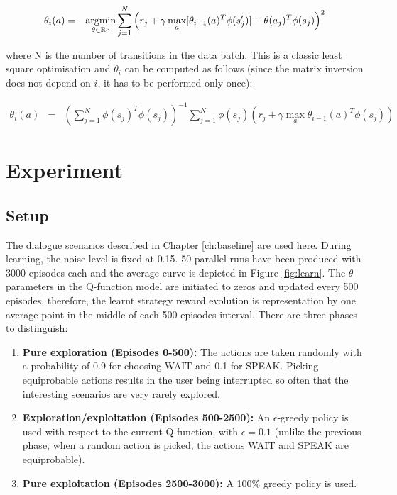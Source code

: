 				\begin{eqnarray}
					\theta_i (a) & = & \mathop{\hbox{argmin}}_{\theta \in \mathbb{R}^p} \sum_{j=1}^N \left(r_j + \gamma \mathop{\hbox{max}}_a [\theta_{i-1}(a)^T \phi(s_j')] - \theta (a_j)^T \phi(s_j) \right)^2
				\end{eqnarray}
            
      	where N is the number of transitions in the data batch. This is a classic least square optimisation and $\theta_i$ can be computed as follows (since the matrix inversion does not depend on $i$, it has to be performed only once):
        
				\begin{eqnarray}
					\theta_i (a) & = & \left( \sum_{j=1}^N \phi(s_j)^T \phi(s_j) \right)^{-1} \sum_{j=1}^N \phi(s_j) \left( r_j + \gamma \max_a \theta_{i-1}(a)^T \phi(s_j) \right)
				\end{eqnarray}

\section{Experiment}
	
    \subsection{Setup}

		The dialogue scenarios described in Chapter \ref{ch:baseline} are used here. During learning, the noise level is fixed at 0.15. 50 parallel runs have been produced with 3000 episodes each and the average curve is depicted in Figure \ref{fig:learn}. The $\theta$ parameters in the Q-function model are initiated to zeros and updated every 500 episodes, therefore, the learnt strategy reward evolution is representation by one average point in the middle of each 500 episodes interval. There are three phases to distinguish:
        
        \begin{enumerate}
        	\item \textbf{Pure exploration (Episodes 0-500):} The actions are taken randomly with a probability of 0.9 for choosing WAIT and 0.1 for SPEAK. Picking equiprobable actions results in the user being interrupted so often that the interesting scenarios are very rarely explored.
            \item \textbf{Exploration/exploitation (Episodes 500-2500):} An $\epsilon$-greedy policy is used with respect to the current Q-function, with $\epsilon=0.1$ (unlike the previous phase, when a random action is picked, the actions WAIT and SPEAK are equiprobable).
            \item \textbf{Pure exploitation (Episodes 2500-3000):} A 100\% greedy policy is used.
        \end{enumerate}
				
